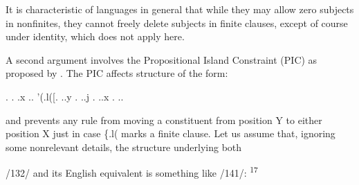 It is characteristic of languages in general that while they may allow zero subjects in nonfinites, they cannot freely delete subjects in finite clauses, except of course under identity, which does not apply here.

A second argument involves the Propositional Island Constraint (PIC) as proposed by \citet{Chomsky1977}. The PIC affects structure of the form:

\ea\label{ex:2:140}
 . . .x .. '(.l([. ..y . ..j . ..x . ..
\glt
\z

and prevents any rule from moving a constituent from position Y to either position X just in case \{.l( marks a finite clause. Let us assume that, ignoring some nonrelevant details, the structure underlying both

/132/ and its English equivalent is something like /141/: \textsuperscript{17}

